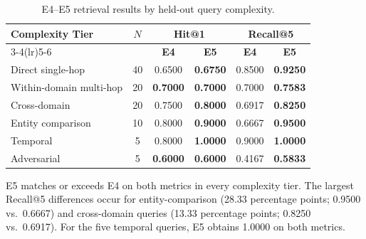 \begin{table}[!htbp]
\centering
\caption{E4--E5 retrieval results by held-out query complexity.}
\label{tab:retrieval_complexity}
\begingroup
\setlength{\tabcolsep}{7pt}
\renewcommand{\arraystretch}{1.12}
\begin{tabular}{lccccc}
\toprule
\multirow{2}{*}{\textbf{Complexity Tier}} & \multirow{2}{*}{\textbf{$N$}} & \multicolumn{2}{c}{\textbf{Hit@1}} & \multicolumn{2}{c}{\textbf{Recall@5}} \\
\cmidrule(lr){3-4}\cmidrule(lr){5-6}
& & \textbf{E4} & \textbf{E5} & \textbf{E4} & \textbf{E5} \\
\midrule
Direct single-hop       & 40 & 0.6500 & \textbf{0.6750} & 0.8500 & \textbf{0.9250} \\
Within-domain multi-hop & 20 & \textbf{0.7000} & \textbf{0.7000} & 0.7000 & \textbf{0.7583} \\
Cross-domain            & 20 & 0.7500 & \textbf{0.8000} & 0.6917 & \textbf{0.8250} \\
Entity comparison       & 10 & 0.8000 & \textbf{0.9000} & 0.6667 & \textbf{0.9500} \\
Temporal                 & 5 & 0.8000 & \textbf{1.0000} & 0.9000 & \textbf{1.0000} \\
Adversarial              & 5 & \textbf{0.6000} & \textbf{0.6000} & 0.4167 & \textbf{0.5833} \\
\bottomrule
\end{tabular}
\endgroup
\end{table}

E5 matches or exceeds E4 on both metrics in every complexity tier. The largest Recall@5 differences occur for entity-comparison (28.33 percentage points; 0.9500 vs.\ 0.6667) and cross-domain queries (13.33 percentage points; 0.8250 vs.\ 0.6917). For the five temporal queries, E5 obtains 1.0000 on both metrics.

